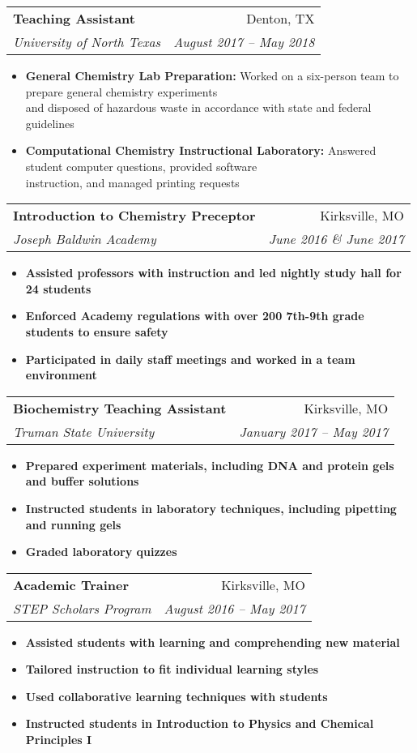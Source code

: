 \documentclass[letterpaper,11pt]{article}
\makeatletter
\newcommand{\resumeItem}[2]{
  \item\small{
    \textbf{#1}{ #2 \vspace{-2pt}}
  }
}
\newcommand{\resumeSubheading}[4]{
  \vspace{-1pt}\item
    \begin{tabular*}{0.97\textwidth}[t]{l@{\extracolsep{\fill}}r}
      \textbf{#1} & #2 \\
      \textit{\small#3} & \textit{\small #4} \\
    \end{tabular*}\vspace{-5pt}
}
\newcommand{\resumeSubHeadingListStart}{\begin{itemize}[leftmargin=*]}
\newcommand{\resumeSubHeadingListEnd}{\end{itemize}}
\newcommand{\resumeItemListStart}{\begin{itemize}}
\newcommand{\resumeItemListEnd}{\end{itemize}\vspace{-5pt}}
\makeatother
\begin{document}
    \resumeSubheading
      {Teaching Assistant}{Denton, TX}
      {University of North Texas}{August 2017 -- May 2018}
      \resumeItemListStart
        \resumeItem{General Chemistry Lab Preparation\textnormal{:}}
          {Worked on a six-person team to prepare general chemistry experiments \\ and disposed of hazardous waste in accordance with state and federal guidelines}
        \resumeItem{Computational Chemistry Instructional Laboratory\textnormal{:}}
          {Answered student computer questions, provided software \\instruction, and managed printing requests}
      \resumeItemListEnd
%
%
    \resumeSubheading
      {Introduction to Chemistry Preceptor}{Kirksville, MO}
      {Joseph Baldwin Academy}{June 2016 \& June 2017}
      \resumeItemListStart
        \resumeItem{\textnormal{Assisted professors with instruction and led nightly study hall for 24 students}}
          {}
        \resumeItem{\textnormal{Enforced Academy regulations with over 200 7th-9th grade students to ensure safety}}
          {}
        \resumeItem{\textnormal{Participated in daily staff meetings and worked in a team environment}}
          {}
      \resumeItemListEnd

    \resumeSubheading
      {Biochemistry Teaching Assistant}{Kirksville, MO}
      {Truman State University}{January 2017 -- May 2017}
      \resumeItemListStart
        \resumeItem{\textnormal{Prepared experiment materials, including DNA and protein gels and buffer solutions}}
          {}
        \resumeItem{\textnormal{Instructed students in laboratory techniques, including pipetting and running gels}}
          {}
        \resumeItem{\textnormal{Graded laboratory quizzes}}
          {}
      \resumeItemListEnd

    \resumeSubheading
      {Academic Trainer}{Kirksville, MO}
      {STEP Scholars Program}{August 2016 -- May 2017}
      \resumeItemListStart
        \resumeItem{\textnormal{Assisted students with learning and comprehending new material}}
          {}
        \resumeItem{\textnormal{Tailored instruction to fit individual learning styles}}
          {}
        \resumeItem{\textnormal{Used collaborative learning techniques with students}}
          {}
        \resumeItem{\textnormal{Instructed students in Introduction to Physics and Chemical Principles I}}
          {}
      \resumeItemListEnd
      
\end{document}
